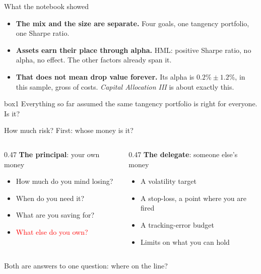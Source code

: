 \documentclass[aspectratio=169,10pt]{beamer}
\begin{document}
\begin{frame}{What the notebook showed}
\vskip 8pt
\begin{itemize}
\item \textbf{The mix and the size are separate.} Four goals, one tangency portfolio, one Sharpe ratio.
\vskip 10pt
\item \textbf{Assets earn their place through alpha.} HML: positive Sharpe ratio, no alpha, no effect. The other factors already span it.
\vskip 10pt
\item \textbf{That does not mean drop value forever.} Its alpha is $0.2\% \pm 1.2\%$, in this sample, gross of costs. \emph{Capital Allocation III} is about exactly this.
\end{itemize}
\vskip 14pt
\begin{beamercolorbox}[rounded=true,sep=7pt,center]{box1}
Everything so far assumed the same tangency portfolio is right for everyone. Is it?
\end{beamercolorbox}
\vskip 10pt
\end{frame}

\begin{frame}{How much risk? First: whose money is it?}
\vskip 10pt
\begin{columns}[t]
\begin{column}{0.47\textwidth}
\textbf{The principal}: your own money
\vskip 8pt
\begin{itemize}
\item How much do you mind losing?
\vskip 5pt
\item When do you need it?
\vskip 5pt
\item What are you saving for?
\vskip 5pt
\item \textcolor{red}{What else do you own?}
\end{itemize}
\end{column}
\begin{column}{0.47\textwidth}
\textbf{The delegate}: someone else's money
\vskip 8pt
\begin{itemize}
\item A volatility target
\vskip 5pt
\item A stop-loss, a point where you are fired
\vskip 5pt
\item A tracking-error budget
\vskip 5pt
\item Limits on what you can hold
\end{itemize}
\end{column}
\end{columns}
\vskip 20pt
\begin{center}
Both are answers to one question: where on the line?
\end{center}
\end{frame}
\end{document}
